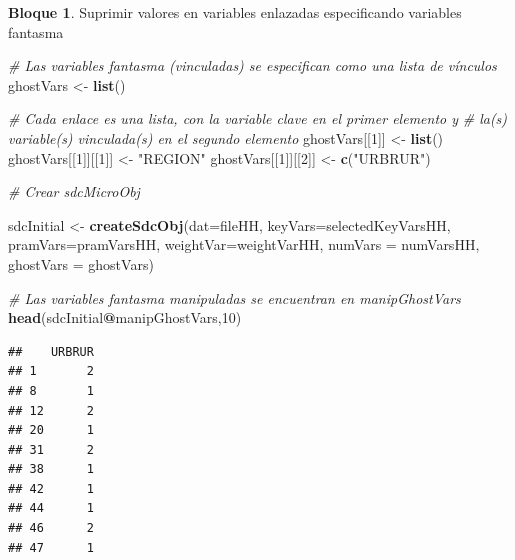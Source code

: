 \documentclass[]{book}
\newenvironment{Shaded}{\begin{snugshade}}{\end{snugshade}}
\newcommand{\CommentTok}[1]{\textcolor[rgb]{0.56,0.35,0.01}{\textit{#1}}}
\newcommand{\DataTypeTok}[1]{\textcolor[rgb]{0.13,0.29,0.53}{#1}}
\newcommand{\DecValTok}[1]{\textcolor[rgb]{0.00,0.00,0.81}{#1}}
\newcommand{\KeywordTok}[1]{\textcolor[rgb]{0.13,0.29,0.53}{\textbf{#1}}}
\newcommand{\NormalTok}[1]{#1}
\newcommand{\OperatorTok}[1]{\textcolor[rgb]{0.81,0.36,0.00}{\textbf{#1}}}
\newcommand{\StringTok}[1]{\textcolor[rgb]{0.31,0.60,0.02}{#1}}
\theoremstyle{definition}
\theoremstyle{definition}
\newtheorem{example}{Bloque}[chapter]
\theoremstyle{definition}
\theoremstyle{definition}
\theoremstyle{remark}
\begin{document}
\begin{example}
\protect\hypertarget{exm:bloque24jgm}{}{\label{exm:bloque24jgm} }Suprimir valores en variables enlazadas especificando variables fantasma
\end{example}

\begin{Shaded}
\begin{Highlighting}[]
\CommentTok{# Las variables fantasma (vinculadas) se especifican como una lista de vínculos}
\NormalTok{ghostVars <-}\StringTok{ }\KeywordTok{list}\NormalTok{()}

\CommentTok{# Cada enlace es una lista, con la variable clave en el primer elemento y}
\CommentTok{# la(s) variable(s) vinculada(s) en el segundo elemento}
\NormalTok{ghostVars[[}\DecValTok{1}\NormalTok{]] <-}\StringTok{ }\KeywordTok{list}\NormalTok{()}
\NormalTok{ghostVars[[}\DecValTok{1}\NormalTok{]][[}\DecValTok{1}\NormalTok{]] <-}\StringTok{ "REGION"}
\NormalTok{ghostVars[[}\DecValTok{1}\NormalTok{]][[}\DecValTok{2}\NormalTok{]] <-}\StringTok{ }\KeywordTok{c}\NormalTok{(}\StringTok{"URBRUR"}\NormalTok{)}

\CommentTok{# Crear sdcMicroObj}

\NormalTok{sdcInitial <-}\StringTok{ }\KeywordTok{createSdcObj}\NormalTok{(}\DataTypeTok{dat=}\NormalTok{fileHH, }\DataTypeTok{keyVars=}\NormalTok{selectedKeyVarsHH, }\DataTypeTok{pramVars=}\NormalTok{pramVarsHH, }\DataTypeTok{weightVar=}\NormalTok{weightVarHH, }\DataTypeTok{numVars =}\NormalTok{ numVarsHH, }\DataTypeTok{ghostVars =}\NormalTok{ ghostVars)}

\CommentTok{# Las variables fantasma manipuladas se encuentran en manipGhostVars}
\KeywordTok{head}\NormalTok{(sdcInitial}\OperatorTok{@}\NormalTok{manipGhostVars,}\DecValTok{10}\NormalTok{)}
\end{Highlighting}
\end{Shaded}

\begin{verbatim}
##    URBRUR
## 1       2
## 8       1
## 12      2
## 20      1
## 31      2
## 38      1
## 42      1
## 44      1
## 46      2
## 47      1
\end{verbatim}
\end{document}

